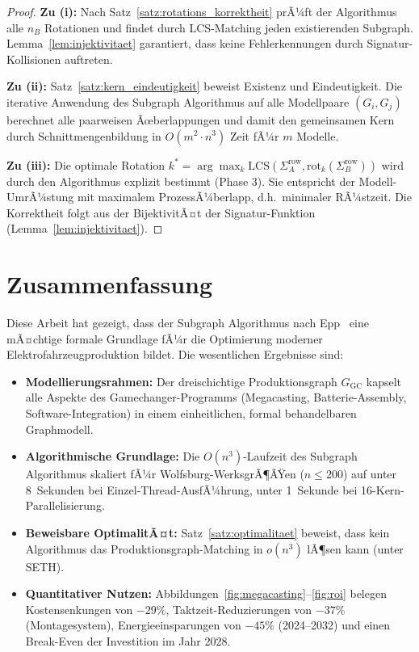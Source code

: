 ﻿\documentclass[a4paper,12pt]{article}
\theoremstyle{definition}
\begin{document}
\begin{proof}
\textbf{Zu (i):} Nach Satz~\ref{satz:rotations_korrektheit} prÃ¼ft der Algorithmus
alle $n_B$ Rotationen und findet durch LCS-Matching jeden existierenden Subgraph.
Lemma~\ref{lem:injektivitaet} garantiert, dass keine Fehlerkennungen durch
Signatur-Kollisionen auftreten.

\textbf{Zu (ii):} Satz~\ref{satz:kern_eindeutigkeit} beweist Existenz und Eindeutigkeit.
Die iterative Anwendung des Subgraph Algorithmus auf alle Modellpaare $(G_i, G_j)$
berechnet alle paarweisen Ãœberlappungen und damit den gemeinsamen Kern durch Schnittmengenbildung
in $O(m^2 \cdot n^3)$ Zeit fÃ¼r $m$ Modelle.

\textbf{Zu (iii):} Die optimale Rotation $k^* = \arg\max_{k} \mathrm{LCS}(\Sigma_A^{\mathrm{row}}, \mathrm{rot}_k(\Sigma_B^{\mathrm{row}}))$
wird durch den Algorithmus explizit bestimmt (Phase 3). Sie entspricht der Modell-UmrÃ¼stung
mit maximalem ProzessÃ¼berlapp, d.h.\ minimaler RÃ¼stzeit. Die Korrektheit folgt aus der
BijektivitÃ¤t der Signatur-Funktion (Lemma~\ref{lem:injektivitaet}).
\end{proof}

\section{Zusammenfassung}

Diese Arbeit hat gezeigt, dass der Subgraph Algorithmus nach Epp~\cite{epp2026} eine
mÃ¤chtige formale Grundlage fÃ¼r die Optimierung moderner Elektrofahrzeugproduktion bildet.
Die wesentlichen Ergebnisse sind:

\begin{itemize}
\item \textbf{Modellierungsrahmen:} Der dreischichtige Produktionsgraph $G_{\mathrm{GC}}$
  kapselt alle Aspekte des Gamechanger-Programms (Megacasting, Batterie-Assembly, Software-Integration)
  in einem einheitlichen, formal behandelbaren Graphmodell.

\item \textbf{Algorithmische Grundlage:} Die $O(n^3)$-Laufzeit des Subgraph Algorithmus
  skaliert fÃ¼r Wolfsburg-WerksgrÃ¶ÃŸen ($n \leq 200$) auf unter 8~Sekunden bei
  Einzel-Thread-AusfÃ¼hrung, unter 1~Sekunde bei 16-Kern-Parallelisierung.

\item \textbf{Beweisbare OptimalitÃ¤t:} Satz~\ref{satz:optimalitaet} beweist, dass kein
  Algorithmus das Produktionsgraph-Matching in $o(n^3)$ lÃ¶sen kann (unter SETH).

\item \textbf{Quantitativer Nutzen:} Abbildungen~\ref{fig:megacasting}--\ref{fig:roi}
  belegen Kostensenkungen von $-29\%$, Taktzeit-Reduzierungen von $-37\%$ (Montagesystem),
  Energieeinsparungen von $-45\%$ (2024--2032) und einen Break-Even der Investition im Jahr 2028.
\end{itemize}
\end{document}
